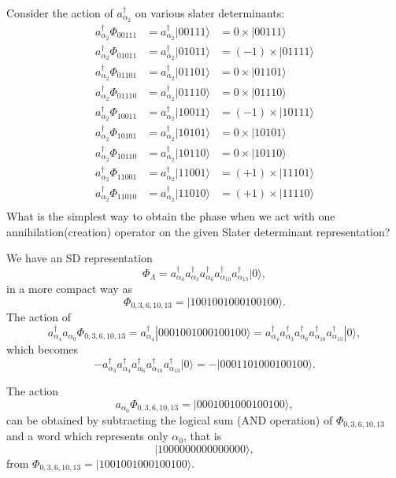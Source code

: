 \documentclass[graybox,sectrefs,envcountresetchap,open=right]{svmonodo}
\begin{document}
\noindent
Consider the action of $a^{\dagger}_{\alpha_2}$ on various slater determinants:
\[
\begin{array}{ccc}
a^{\dagger}_{\alpha_2}\Phi_{00111}& = a^{\dagger}_{\alpha_2}|00111\rangle&=0\times |00111\rangle\\
a^{\dagger}_{\alpha_2}\Phi_{01011}& = a^{\dagger}_{\alpha_2}|01011\rangle&=(-1)\times |01111\rangle\\
a^{\dagger}_{\alpha_2}\Phi_{01101}& = a^{\dagger}_{\alpha_2}|01101\rangle&=0\times |01101\rangle\\
a^{\dagger}_{\alpha_2}\Phi_{01110}& = a^{\dagger}_{\alpha_2}|01110\rangle&=0\times |01110\rangle\\
a^{\dagger}_{\alpha_2}\Phi_{10011}& = a^{\dagger}_{\alpha_2}|10011\rangle&=(-1)\times |10111\rangle\\
a^{\dagger}_{\alpha_2}\Phi_{10101}& = a^{\dagger}_{\alpha_2}|10101\rangle&=0\times |10101\rangle\\
a^{\dagger}_{\alpha_2}\Phi_{10110}& = a^{\dagger}_{\alpha_2}|10110\rangle&=0\times |10110\rangle\\
a^{\dagger}_{\alpha_2}\Phi_{11001}& = a^{\dagger}_{\alpha_2}|11001\rangle&=(+1)\times |11101\rangle\\
a^{\dagger}_{\alpha_2}\Phi_{11010}& = a^{\dagger}_{\alpha_2}|11010\rangle&=(+1)\times |11110\rangle\\
\end{array}
\]
What is the simplest way to obtain the phase when we act with one annihilation(creation) operator
on the given Slater determinant representation?




We have an SD representation
\[
\Phi_{\Lambda} = a_{\alpha_0}^{\dagger} a_{\alpha_3}^{\dagger} a_{\alpha_6}^{\dagger} a_{\alpha_{10}}^{\dagger} a_{\alpha_{13}}^{\dagger} |0\rangle,
\]
in a more compact way as
\[
\Phi_{0,3,6,10,13} = |1001001000100100\rangle.
\]
The action of
\[
a^{\dagger}_{\alpha_4}a_{\alpha_0}\Phi_{0,3,6,10,13} = a^{\dagger}_{\alpha_4}|0001001000100100\rangle=a^{\dagger}_{\alpha_4}a_{\alpha_3}^{\dagger} a_{\alpha_6}^{\dagger} a_{\alpha_{10}}^{\dagger} a_{\alpha_{13}}^{\dagger} |0\rangle,
\]
which becomes
\[
-a_{\alpha_3}^{\dagger} a^{\dagger}_{\alpha_4} a_{\alpha_6}^{\dagger} a_{\alpha_{10}}^{\dagger} a_{\alpha_{13}}^{\dagger} |0\rangle=-|0001101000100100\rangle.
\]





The action
\[
a_{\alpha_0}\Phi_{0,3,6,10,13} = |0001001000100100\rangle,
\]
can be obtained by subtracting the logical sum (AND operation) of $\Phi_{0,3,6,10,13}$ and 
a word which represents only $\alpha_0$, that is
\[
|1000000000000000\rangle,
\] 
from $\Phi_{0,3,6,10,13}= |1001001000100100\rangle$.
\end{document}
